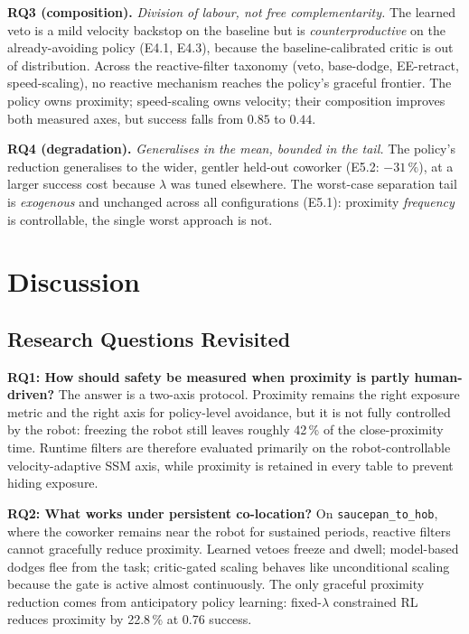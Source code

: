 \documentclass[11pt,a4paper]{report}
\newcommand{\ssm}{SSM}
\begin{document}
\textbf{RQ3 (composition).} \emph{Division of labour, not free
complementarity.} The learned veto is a mild velocity backstop on the
baseline but is \emph{counterproductive} on the already-avoiding policy
(E4.1, E4.3), because the baseline-calibrated critic is out of
distribution. Across the reactive-filter taxonomy (veto, base-dodge,
EE-retract, speed-scaling), no reactive mechanism reaches the policy's
graceful frontier. The policy owns proximity; speed-scaling owns
velocity; their composition improves both measured axes, but success
falls from $0.85$ to $0.44$.

\textbf{RQ4 (degradation).} \emph{Generalises in the mean, bounded in
the tail.} The policy's reduction generalises to the wider, gentler
held-out coworker (E5.2: $-31\,\%$), at a larger success cost because
$\lambda$ was tuned elsewhere. The worst-case separation tail is
\emph{exogenous} and unchanged across all configurations (E5.1):
proximity \emph{frequency} is controllable, the single worst approach
is not.
\fi

\chapter{Discussion}
\label{ch:disc}

\section{Research Questions Revisited}
\label{sec:disc:rqs-revisited}

\textbf{RQ1: How should safety be measured when proximity is partly
human-driven?} The answer is a two-axis protocol. Proximity remains the
right exposure metric and the right axis for policy-level avoidance,
but it is not fully controlled by the robot: freezing the robot still
leaves roughly 42\,\% of the close-proximity time. Runtime filters are
therefore evaluated primarily on the robot-controllable
velocity-adaptive \ssm{} axis, while proximity is retained in every
table to prevent hiding exposure.

\textbf{RQ2: What works under persistent co-location?} On
\texttt{saucepan\_to\_hob}, where the coworker remains near the robot
for sustained periods, reactive filters cannot gracefully reduce
proximity. Learned vetoes freeze and dwell; model-based dodges flee
from the task; critic-gated scaling behaves like unconditional scaling
because the gate is active almost continuously. The only graceful
proximity reduction comes from anticipatory policy learning:
fixed-$\lambda$ constrained RL reduces proximity by 22.8\,\% at 0.76
success.
\end{document}
